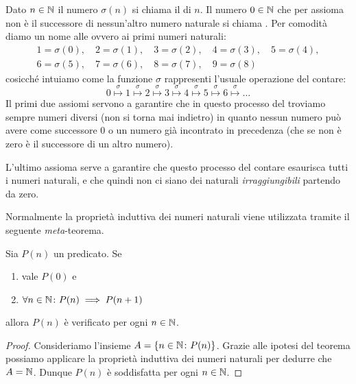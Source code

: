 Dato $n\in {\mathbb N}$ il numero $\sigma(n)$ si chiama il  di $n$.
Il numero $0\in {\mathbb N}$ che per assioma non è il successore di nessun'altro 
numero naturale si chiama . 
Per comodità diamo un nome alle  
ovvero ai primi numeri naturali:
\begin{equation}\label{eq:cifre}
\begin{gathered}
 1 = \sigma(0),\quad  
 2 = \sigma(1),\quad
 3 = \sigma(2),\quad 
 4 = \sigma(3),\quad
 5 = \sigma(4),\\ 
 6 = \sigma(5),\quad 
 7 = \sigma(6),\quad 
 8 = \sigma(7),\quad 
 9 = \sigma(8)
\end{gathered}
\end{equation}
 cosicché intuiamo come la funzione $\sigma$ rappresenti 
 l'usuale operazione del contare:
 \[
 0 \stackrel\sigma\mapsto 1 \stackrel\sigma\mapsto 2 \stackrel\sigma\mapsto 
 3 \stackrel\sigma\mapsto 4 \stackrel\sigma\mapsto 5 \stackrel\sigma\mapsto 
 6 \stackrel\sigma\mapsto \dots  
 \]
Il primi due assiomi servono a garantire che in questo processo del 
troviamo sempre numeri diversi (non si torna mai indietro) in quanto nessun numero 
può avere come successore $0$ o un numero già incontrato in precedenza (che 
se non è zero è il successore di un altro numero).

L'ultimo assioma serve a garantire che questo processo del contare esaurisca tutti 
i numeri naturali, e che quindi non ci siano dei naturali \emph{irraggiungibili}
partendo da zero.

Normalmente la proprietà induttiva dei numeri naturali viene utilizzata tramite 
il seguente \emph{meta}-teorema.

\begin{theorem}
  Sia $P(n)$ un predicato.
  Se 
  \begin{enumerate}
    \item vale $P(0)$ e 
    \item $\forall n\in {\mathbb N}\colon P(n)\implies P(n+1)$
  \end{enumerate} 
  allora $P(n)$ è verificato per ogni $n\in {\mathbb N}$.
\end{theorem}
%
\begin{proof}
  Consideriamo l'insieme $A=\{n\in {\mathbb N}\colon P(n)\}$.
  Grazie alle ipotesi del teorema possiamo applicare la proprietà 
  induttiva dei numeri naturali per dedurre che $A={\mathbb N}$.
  Dunque $P(n)$ è soddisfatta per ogni $n\in{\mathbb N}$.
\end{proof}

